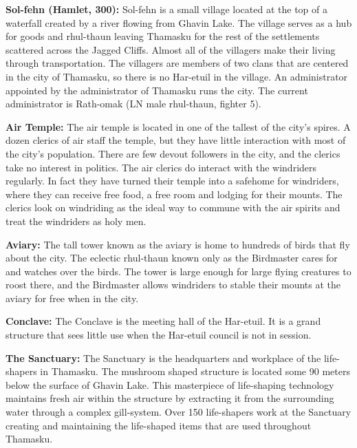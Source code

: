 {
	\textbf{Sol-fehn (Hamlet, 300):} Sol-fehn is a small village located at the top of a waterfall created by a river flowing from Ghavin Lake. The village serves as a hub for goods and rhul-thaun leaving Thamasku for the rest of the settlements scattered across the Jagged Cliffs. Almost all of the villagers make their living through transportation. The villagers are members of two clans that are centered in the city of Thamasku, so there is no Har-etuil in the village. An administrator appointed by the administrator of Thamasku runs the city. The current administrator is Rath-omak (LN male rhul-thaun, fighter 5).
}
{
	\textbf{Air Temple:} The air temple is located in one of the tallest of the city's spires. A dozen clerics of air staff the temple, but they have little interaction with most of the city's population. There are few devout followers in the city, and the clerics take no interest in politics. The air clerics do interact with the windriders regularly. In fact they have turned their temple into a safehome for windriders, where they can receive free food, a free room and lodging for their mounts. The clerics look on windriding as the ideal way to commune with the air spirits and treat the windriders as holy men.

	\textbf{Aviary:} The tall tower known as the aviary is home to hundreds of birds that fly about the city. The eclectic rhul-thaun known only as the Birdmaster cares for and watches over the birds. The tower is large enough for large flying creatures to roost there, and the Birdmaster allows windriders to stable their mounts at the aviary for free when in the city.

	\textbf{Conclave:} The Conclave is the meeting hall of the Har-etuil. It is a grand structure that sees little use when the Har-etuil council is not in session.

	\textbf{The Sanctuary:} The Sanctuary is the headquarters and workplace of the life-shapers in Thamasku. The mushroom shaped structure is located some 90 meters below the surface of Ghavin Lake. This masterpiece of life-shaping technology maintains fresh air within the structure by extracting it from the surrounding water through a complex gill-system. Over 150 life-shapers work at the Sanctuary creating and maintaining the life-shaped items that are used throughout Thamasku.
}
